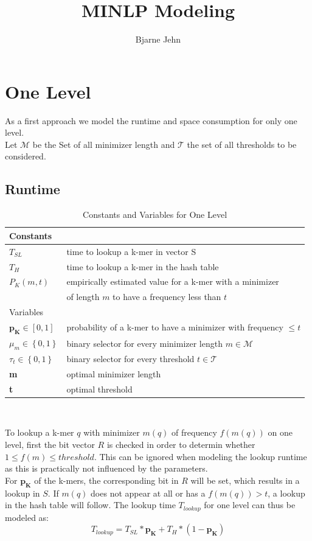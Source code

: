 \documentclass{article}
\title{MINLP Modeling}
\author{Bjarne Jehn}
\newcommand{\lookupTime}{T_{lookup}}
\newcommand{\timeForLookupInS}{{T_{SL}}}
\newcommand{\timeForHashtable}{{T_H}}
\newcommand{\percKmers}{\textbf{p}_\textbf{K}}
\newcommand{\percKmersEmpiric}{P_{K}}
\newcommand{\possibleMinimizerLength}{\mathcal{M}}
\newcommand{\possibleThresholds}{\mathcal{T}}
\newcommand{\minimizerLength}{\textbf{m}}
\newcommand{\threshold}{\textbf{t}}
\newcommand{\selectorm}{\mu}
\newcommand{\selectort}{\tau}
\begin{document}
	
\maketitle
\newpage



\section*{One Level}
As a first approach we model the runtime and space consumption for only one level.\\
Let $\possibleMinimizerLength$ be the Set of all minimizer length and $\possibleThresholds$ the set of all thresholds to be considered.
\subsection*{Runtime}
\begin{table}
\caption{Constants and Variables for One Level}
\begin{tabular}{|| l | l ||}
	\hline
	Constants	&  \\
	\hline
	$\timeForLookupInS$		& time to lookup a k-mer in vector S \\
	$\timeForHashtable$		& time to lookup a k-mer in the hash table \\
	$\percKmersEmpiric(m, t)$ &empirically estimated value for a k-mer with a minimizer \\
	& of length $m$ to have a frequency less than $t$ \\
	\hline
	\hline
	Variables	&  \\
	\hline
	$\percKmers \in \left[0,1\right]$ & probability of a k-mer to have a minimizer with frequency $\leq t$ \\
	$\selectorm_m \in \left\{0, 1\right\}$	& binary selector for every minimizer length $m \in \possibleMinimizerLength$\\
	$\selectort_t \in \left\{0, 1\right\}$	& binary selector for every threshold $t \in \possibleThresholds$\\
	\minimizerLength & optimal minimizer length\\
	\threshold & optimal threshold\\
	\hline 
\end{tabular}\\
\end{table}

To lookup a k-mer $q$ with minimizer $m(q)$ of frequency $f(m(q))$ on one level, first the bit vector $R$ is checked in order to determin whether $1 \leq f(m) \leq threshold$. This can be ignored when modeling the lookup runtime as this is practically not influenced by the parameters. \\
For $\percKmers$ of the k-mers, the corresponding bit in $R$ will be set, which results in a lookup in $S$. If $m(q)$ does not appear at all or has a $f(m(q)) > t$, a lookup in the hash table will follow. The lookup time $\lookupTime$ for one level can thus be modeled as:
\begin{equation*}
	\lookupTime = \timeForLookupInS * \percKmers + \timeForHashtable * (1-\percKmers)
\end{equation*}
\end{document}
